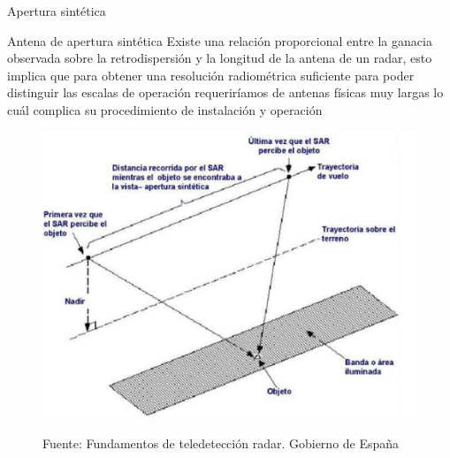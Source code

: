 \begin{frame}{Apertura sintética}
  \begin{block}{Antena de apertura sintética}
    Existe una relación proporcional entre la ganacia observada sobre la retrodispersión y la longitud de la antena de un radar, esto implica que para obtener una resolución radiométrica suficiente para poder distinguir las escalas de operación requeriríamos de antenas físicas muy largas lo cuál complica su procedimiento de instalación y operación
  \end{block}

  \begin{figure}
    \begin{center}
        \includegraphics[scale=0.3]{img/section_03/principio_03}  \\
    \end{center}
    \caption{Fuente: Fundamentos de teledetección radar. Gobierno de España}
    \label{fig:resolucion_temporal}
  \end{figure}
\end{frame}

